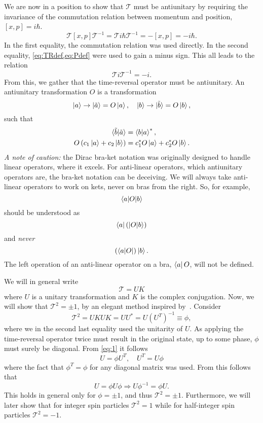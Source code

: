 We are now in a position to show that $\mathcal{T}$ must be antiunitary by requiring the invariance of the commutation relation between momentum and position, $[x, p] = i\hbar$.
\begin{equation}
  \mathcal{T} [x, p] \mathcal{T}^{-1} = \mathcal{T} i\hbar \mathcal{T}^{-1} = - [x, p] = -i\hbar.
\end{equation}
In the first equality, the commutation relation was used directly.
In the second equality, \cref{eq:TRdef,eq:Pdef} were used to gain a minus sign.
This all leads to the relation
\begin{equation}
  \mathcal{T} i \mathcal{T}^{-1} = -i.
\end{equation}
From this, we gather that the time-reversal operator must be antiunitary.
An antiunitary transformation \( O \) is a transformation
$$
\ket{a} \rightarrow \ket{\tilde{a}} = O \ket{a}, \quad
\ket{b} \rightarrow \ket{\tilde{b}} = O \ket{b},
$$
such that
\begin{align}
  \braket{\tilde{b} | \tilde{a}} &= \braket{b | a}^*,\\
  O\left(c_1 \ket{a} + c_2 \ket{b}\right) &= c_1^* O\ket{a} + c_2^* O\ket{b}.
\end{align}
\emph{A note of caution:} the Dirac bra-ket notation was originally designed to handle linear operators, where it excels.
For anti-linear operators, which antiunitary operators are, the bra-ket notation can be deceiving.
We will always take anti-linear operators to work on kets, never on bras from the right.
So, for example,
$$ \braket{a| O | b} $$
should be understood as
$$ \bra{a} \left(\ket{O |b}\right)$$
and \emph{never}
$$ \left(\bra{a|O}\right) \ket{b}.$$
The left operation of an anti-linear operator on a bra, $\bra{a} O$, will not be defined.

We will in general write
\begin{equation}
  \label{eq:time-rev-def}
  \mathcal{T} = U K
\end{equation}
where $U$ is a unitary transformation and $K$ is the complex conjugation.
Now, we will show that $\mathcal{T}^2 = \pm 1$, by an elegant method inspired by~\textcite{bernevigTopologicalInsulatorsTopological2013}.
Consider
\begin{equation}
  \label{eq:1}
  \mathcal{T}^2 = UKUK = UU^* = U(U^T)^{-1} \equiv \phi,
\end{equation}
where we in the second last equality used the unitarity of $U$.
As applying the time-reversal operator twice must result in the original state, up to some phase, $\phi$ must surely be diagonal.
From \cref{eq:1} it follows
\begin{equation}
  U = \phi U^T, \quad U^T = U \phi
\end{equation}
where the fact that $\phi^T = \phi$ for any diagonal matrix was used.
From this follows that
\begin{equation}
  U = \phi U \phi \Rightarrow U \phi^{-1} = \phi U.
\end{equation}
This holds in general only for $\phi = \pm 1$, and thus $\mathcal{T}^2 = \pm 1$.
Furthermore, we will later show that for integer spin particles $\mathcal{T}^2 = 1$ while for half-integer spin particles $\mathcal{T}^2 = -1$.


